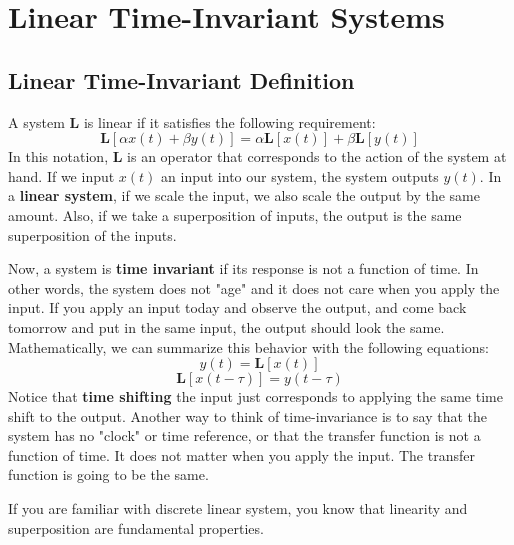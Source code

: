 \section{Linear Time-Invariant Systems}
\subsection{Linear Time-Invariant Definition}
A system $\mathbf{L}$ is linear if it satisfies the following requirement:
    \begin{equation}
        \mathbf{L} [ \alpha x(t) + \beta y(t) ] = \alpha \mathbf{L}[ x(t) ] + \beta \mathbf{L}[ y(t) ]
    \end{equation}
In this notation, $\mathbf{L}$ is an operator that corresponds to the action of the system at hand. If we input $x(t)$ an input into our system, the system outputs $y(t)$.  In a \textbf{linear system}, if we scale the input, we also scale the output by the same amount. Also, if we take a superposition of inputs, the output is the same superposition of the inputs.

Now, a system is \textbf{time invariant} if its response is not a function of time. In other words, the system does not "age" and it does not care when you apply the input.  If you apply an input today and observe the output, and come back tomorrow and put in the same input, the output should look the same.  Mathematically, we can summarize this behavior with the following equations:
    \begin{equation}
        y(t) = \mathbf{L} [x(t)]
    \end{equation}
    \begin{equation}
        \mathbf{L} [x(t-\tau)] = y(t-\tau)
    \end{equation}
Notice that \textbf{time shifting} the input just corresponds to applying the same time shift to the output.  Another way to think of time-invariance is to say that the system has no  "clock" or time reference, or that the transfer function is not a function of time.  It does not matter when you apply the input.  The transfer function is going to be the same. 

 If you are familiar with discrete linear system, you know that linearity and superposition are fundamental properties. 
